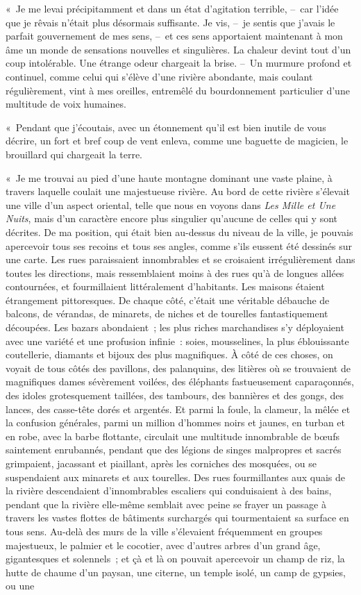 \documentclass[french,twoside]{book} %
\begin{document}
« Je me levai précipitamment et dans un état d’agitation terrible, – car l’idée que je rêvais n’était plus désormais suffisante. Je vis, – je sentis que j’avais le parfait gouvernement de mes sens, – et ces sens apportaient maintenant à mon âme un monde de sensations nouvelles et singulières. La chaleur devint tout d’un coup intolérable. Une étrange odeur chargeait la brise. – Un murmure profond et continuel, comme celui qui s’élève d’une rivière abondante, mais coulant régulièrement, vint à mes oreilles, entremêlé du bourdonnement particulier d’une multitude de voix humaines.\par
« Pendant que j’écoutais, avec un étonnement qu’il est bien inutile de vous décrire, un fort et bref coup de vent enleva, comme une baguette de magicien, le brouillard qui chargeait la terre.\par
« Je me trouvai au pied d’une haute montagne dominant une vaste plaine, à travers laquelle coulait une majestueuse rivière. Au bord de cette rivière s’élevait une ville d’un aspect oriental, telle que nous en voyons dans \emph{Les Mille et Une Nuits}, mais d’un caractère encore plus singulier qu’aucune de celles qui y sont décrites. De ma position, qui était bien au-dessus du niveau de la ville, je pouvais apercevoir tous ses recoins et tous ses angles, comme s’ils eussent été dessinés sur une carte. Les rues paraissaient innombrables et se croisaient irrégulièrement dans toutes les directions, mais ressemblaient moins à des rues qu’à de longues allées contournées, et fourmillaient littéralement d’habitants. Les maisons étaient étrangement pittoresques. De chaque côté, c’était une véritable débauche de balcons, de vérandas, de minarets, de niches et de tourelles fantastiquement découpées. Les bazars abondaient ; les plus riches marchandises s’y déployaient avec une variété et une profusion infinie : soies, mousselines, la plus éblouissante coutellerie, diamants et bijoux des plus magnifiques. À côté de ces choses, on voyait de tous côtés des pavillons, des palanquins, des litières où se trouvaient de magnifiques dames sévèrement voilées, des éléphants fastueusement caparaçonnés, des idoles grotesquement taillées, des tambours, des bannières et des gongs, des lances, des casse-tête dorés et argentés. Et parmi la foule, la clameur, la mêlée et la confusion générales, parmi un million d’hommes noirs et jaunes, en turban et en robe, avec la barbe flottante, circulait une multitude innombrable de bœufs saintement enrubannés, pendant que des légions de singes malpropres et sacrés grimpaient, jacassant et piaillant, après les corniches des mosquées, ou se suspendaient aux minarets et aux tourelles. Des rues fourmillantes aux quais de la rivière descendaient d’innombrables escaliers qui conduisaient à des bains, pendant que la rivière elle-même semblait avec peine se frayer un passage à travers les vastes flottes de bâtiments surchargés qui tourmentaient sa surface en tous sens. Au-delà des murs de la ville s’élevaient fréquemment en groupes majestueux, le palmier et le cocotier, avec d’autres arbres d’un grand âge, gigantesques et solennels ; et çà et là on pouvait apercevoir un champ de riz, la hutte de chaume d’un paysan, une citerne, un temple isolé, un camp de gypsies, ou une 
\end{document}
